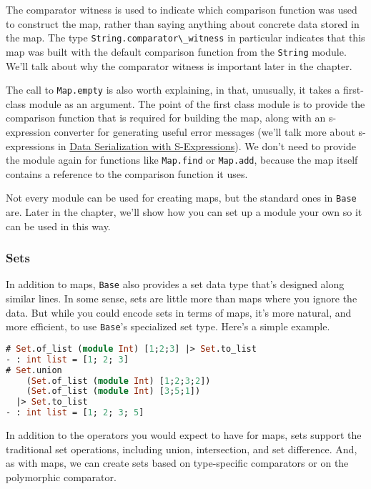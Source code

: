 The comparator witness is used to indicate which comparison function was
used to construct the map, rather than saying anything about concrete
data stored in the map. The type
\passthrough{\lstinline!String.comparator\_witness!} in particular
indicates that this map was built with the default comparison function
from the \passthrough{\lstinline!String!} module. We'll talk about why
the comparator witness is important later in the chapter.

The call to \passthrough{\lstinline!Map.empty!} is also worth
explaining, in that, unusually, it takes a first-class module as an
argument. The point of the first class module is to provide the
comparison function that is required for building the map, along with an
s-expression converter for generating useful error messages (we'll talk
more about s-expressions in \href{data-serialization.html}{Data
Serialization with S-Expressions}). We don't need to provide the module
again for functions like \passthrough{\lstinline!Map.find!} or
\passthrough{\lstinline!Map.add!}, because the map itself contains a
reference to the comparison function it uses.

Not every module can be used for creating maps, but the standard ones in
\passthrough{\lstinline!Base!} are. Later in the chapter, we'll show how
you can set up a module your own so it can be used in this way.

\hypertarget{sets}{%
\subsubsection{Sets}\label{sets}}

In addition to maps, \passthrough{\lstinline!Base!} also provides a set
data type that's designed along similar lines. In some sense, sets are
little more than maps where you ignore the data. But while you could
encode sets in terms of maps, it's more natural, and more efficient, to
use \passthrough{\lstinline!Base!}'s specialized set type. Here's a
simple example. 

\begin{lstlisting}[language=Caml]
# Set.of_list (module Int) [1;2;3] |> Set.to_list
- : int list = [1; 2; 3]
# Set.union
    (Set.of_list (module Int) [1;2;3;2])
    (Set.of_list (module Int) [3;5;1])
  |> Set.to_list
- : int list = [1; 2; 3; 5]
\end{lstlisting}

In addition to the operators you would expect to have for maps, sets
support the traditional set operations, including union, intersection,
and set difference. And, as with maps, we can create sets based on
type-specific comparators or on the polymorphic comparator.

